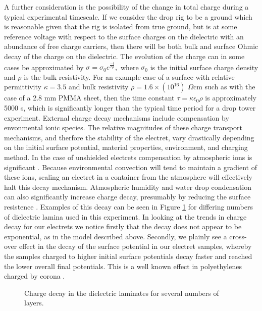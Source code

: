 \documentclass[12pt,a4paper,oneside]{book}
\begin{document}
A further consideration is the possibility of the change in total charge during a typical experimental timescale. If we consider the drop rig to be a ground which is reasonable given that the rig is isolated from true ground, but is at some reference voltage with respect to the surface charges on the dielectric with an abundance of free charge carriers, then there will be both bulk and surface Ohmic decay of the charge on the dielectric. The evolution of the charge can in some cases be approximated by $\sigma = \sigma_0 e^{\frac{-t}{\epsilon \rho}}, $ where $\sigma_0$ is the initial surface charge density and $\rho$ is the bulk resistivity. For an example case of a surface with relative permittivity $\kappa = 3.5$ and bulk resistivity $\rho = 1.6 \times (10^{16})$ $\Omega$cm such as with the case of a 2.8 mm PMMA sheet, then the time constant $\tau = \kappa \epsilon_0 \rho$ is approximately 5000 s, which is significantly longer than the typical time period for a drop tower experiment. External charge decay mechanisms include compensation by envonmental ionic species. The relative magnitudes of these charge transport mechanisms, and therfore the stability of the electret, vary drastically depending on the initial surface potential, material properties, environment, and charging method. In the case of unshielded electrets compensation by atmospheric ions is significant \cite{perlman_electrets_1973}. Because environmental convection will tend to  maintain a gradient of these ions, sealing an electret in a container from the atmosphere will effectively halt this decay mechanism. Atmospheric humidity and water drop condensation can also significantly increase charge decay, presumably by reducing the surface resistence \cite{haenen_characteristic_1975}. Examples of this decay can be seen in Figure \ref{fig:charge_decay} for differing numbers of dielectric lamina used in this experiment. In looking at the trends in charge decay for our electrets we notice firstly that the decay does not appear to be exponential, as in the model described above. Secondly, we plainly see a cross-over effect in the decay of the surface potential in our electret samples, whereby the samples charged to higher initial surface potentials decay faster and reached the lower overall final potentials. This is a well known effect in polyethylenes charged by corona \cite{ferreira_corona_1992}.
\begin{figure}[htb!]
    \centering
    {}
       \caption{Charge decay in the dielectric laminates for several numbers of layers.\label{fig:charge_decay}}
\end{figure}
\newpage
\end{document}
